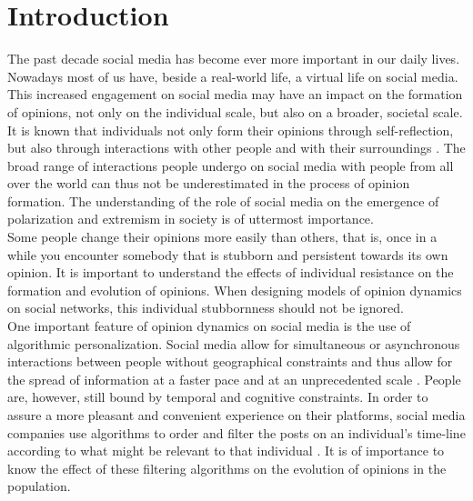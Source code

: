 \documentclass[11 pt , letterpaper , twoside , openright]{book}
\begin{document}
\mainmatter



\pagestyle{fancy}
\fancyhf{}
\lhead{\textcolor{NavyBlue}{\chaptername} \ \textcolor{NavyBlue}{\thechapter}}
\rhead{\rightmark}
\cfoot{\thepage}

\chapter{Introduction}


The past decade social media has become ever more important in our daily lives. Nowadays most of us have, beside a real-world life, a virtual life on social media. This increased engagement on social media may have an impact on the formation of opinions, not only on the individual scale, but also on a broader, societal scale. \\
\newline
It is known that individuals not only form their opinions through self-reflection, but also through interactions with other people and with their surroundings \cite{Perra2019}. The broad range of interactions people undergo on social media with people from all over the world can thus not be underestimated in the process of opinion formation. The understanding of the role of social media on the emergence of polarization and extremism in society is of uttermost importance.\\
\newline
Some people change their opinions more easily than others, that is, once in a while you encounter somebody that is stubborn and persistent towards its own opinion. It is important to understand the effects of individual resistance on the formation and evolution of opinions. When designing models of opinion dynamics on social networks, this individual stubbornness should not be ignored.\\
\newline
One important feature of opinion dynamics on social media is the use of algorithmic personalization. Social media allow for simultaneous or asynchronous interactions between people without geographical constraints and thus allow for the spread of information at a faster pace and at an unprecedented scale \cite{Perra2019}. People are, however, still bound by temporal and cognitive constraints. In order to assure a more pleasant and convenient experience on their platforms, social media companies use algorithms to order and filter the posts on an individual's time-line according to what might be relevant to that individual \cite{Perra2019}. It is of importance to know the effect of these filtering algorithms on the evolution of opinions in the population.\\  
\end{document}

